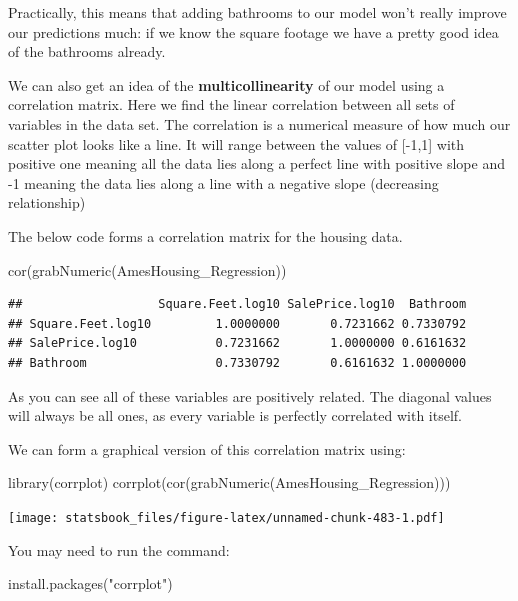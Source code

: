 \documentclass[
]{book}
\newenvironment{Shaded}{\begin{snugshade}}{\end{snugshade}}
\newcommand{\FunctionTok}[1]{\textcolor[rgb]{0.00,0.00,0.00}{#1}}
\newcommand{\NormalTok}[1]{#1}
\newcommand{\StringTok}[1]{\textcolor[rgb]{0.31,0.60,0.02}{#1}}
\theoremstyle{definition}
\theoremstyle{definition}
\theoremstyle{definition}
\theoremstyle{definition}
\theoremstyle{remark}
\begin{document}
Practically, this means that adding bathrooms to our model won't really improve our predictions much: if we know the square footage we have a pretty good idea of the bathrooms already.

We can also get an idea of the \textbf{multicollinearity} of our model using a correlation matrix. Here we find the linear correlation between all sets of variables in the data set. The correlation is a numerical measure of how much our scatter plot looks like a line. It will range between the values of {[}-1,1{]} with positive one meaning all the data lies along a perfect line with positive slope and -1 meaning the data lies along a line with a negative slope (decreasing relationship)

The below code forms a correlation matrix for the housing data.

\begin{Shaded}
\begin{Highlighting}[]
\FunctionTok{cor}\NormalTok{(}\FunctionTok{grabNumeric}\NormalTok{(AmesHousing\_Regression))}
\end{Highlighting}
\end{Shaded}

\begin{verbatim}
##                   Square.Feet.log10 SalePrice.log10  Bathroom
## Square.Feet.log10         1.0000000       0.7231662 0.7330792
## SalePrice.log10           0.7231662       1.0000000 0.6161632
## Bathroom                  0.7330792       0.6161632 1.0000000
\end{verbatim}

As you can see all of these variables are positively related. The diagonal values will always be all ones, as every variable is perfectly correlated with itself.

We can form a graphical version of this correlation matrix using:

\begin{Shaded}
\begin{Highlighting}[]
\FunctionTok{library}\NormalTok{(corrplot)}
\FunctionTok{corrplot}\NormalTok{(}\FunctionTok{cor}\NormalTok{(}\FunctionTok{grabNumeric}\NormalTok{(AmesHousing\_Regression)))}
\end{Highlighting}
\end{Shaded}

\texttt{[image: statsbook\_files/figure-latex/unnamed-chunk-483-1.pdf]}

You may need to run the command:

\begin{Shaded}
\begin{Highlighting}[]
\FunctionTok{install.packages}\NormalTok{(}\StringTok{"corrplot"}\NormalTok{)}
\end{Highlighting}
\end{Shaded}
\end{document}

